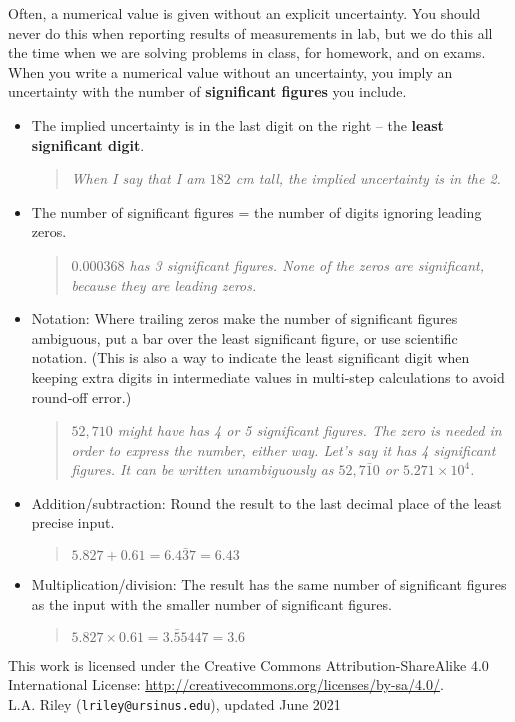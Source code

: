 \documentclass[12pt]{article}
\begin{document}
Often, a numerical value is given without an explicit uncertainty. You
should never do this when reporting results of measurements in lab,
but we do this all the time when we are solving problems in class, for
homework, and on exams. When you write a numerical value without an
uncertainty, you imply an uncertainty with the number of
\textbf{significant figures} you include.
\begin{itemize}
\item The implied uncertainty is in the last digit on the right -- the
  \textbf{least significant digit}.
  \begin{quote}
    \textit{When I say that I am $182$ cm tall, the implied uncertainty
      is in the 2.}
  \end{quote}

\item The number of significant figures = the number of digits
  ignoring leading zeros.
  \begin{quote}
    \textit{$0.000368$ has 3 significant figures. None of the zeros
      are significant, because they are leading zeros.}
  \end{quote}

\item Notation: Where trailing zeros make the number of significant
  figures ambiguous, put a bar over the least significant figure, or
  use scientific notation. (This is also a way to indicate the least
  significant digit when keeping extra digits in intermediate values
  in multi-step calculations to avoid round-off error.)
  \begin{quote}
    \textit{$52,710$ might have has 4 or 5 significant figures. The zero
      is needed in order to express the number, either way. Let's say
      it has 4 significant figures. It can be written unambiguously
      as $52,7\bar{1}0$ or $5.271 \times 10^4$.} 
  \end{quote}

\item Addition/subtraction: Round the result to the last decimal place
  of the least precise input.
  \begin{quote}
    \textit{$5.827 + 0.61 = 6.4\bar{3}7 = 6.43$}
  \end{quote}
  
\item Multiplication/division: The result has the same number of
  significant figures as the input with the smaller number of
  significant figures.
  \begin{quote}
    \textit{$5.827 \times 0.61 = 3.\bar{5}5447 = 3.6$}
  \end{quote}
  
\end{itemize}

{\footnotesize
  \noindent
  \hrulefill
  
  \noindent
  This work is licensed under the Creative Commons
  Attribution-ShareAlike 4.0 International License: 
  \url{http://creativecommons.org/licenses/by-sa/4.0/}.\\

  \noindent
  L.A. Riley (\texttt{lriley@ursinus.edu}), updated June 2021
}
\end{document}
